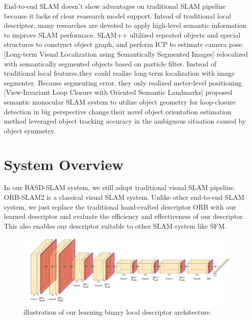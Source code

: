 \documentclass[conference]{IEEEtran}
\begin{document}
End-to-end SLAM doesn't show advantages on traditional SLAM pipeline because it lacks of clear reasearch model support. Intead of traditional local descriptor, many researches are devoted to apply high-level semantic information to improve SLAM performace. 
SLAM++ \cite{c22}ultilized repeated objects and special structures to construct object graph, and perform ICP to estimate camera pose.  
[Long-term Visual Localization using Semantically Segmented Images] \cite{c23}relocalized with semantically segmented objects based on particle filter. Instead of traditional local features,they could realize long-term localization with image segmenter. Because segmenting error, they only realized meter-level positioning.  
[View-Invariant Loop Closure with Oriented Semantic Landmarks] \cite{c24}proposed semantic monocular SLAM system  to utilize object geometry for loop-closure detection in big perspective change.their novel object orientation estimation method  leveraged object tracking accuracy in the ambiguous situation caused by object symmetry.



\section{System Overview}
In our BASD-SLAM system, we still adopt traditional visual SLAM pipeline. ORB-SLAM2 \cite{c25}is a classical visual SLAM system. Unlike other end-to-end SLAM system, we just replace the traditional hand-crafted descriptor ORB with our learned descriptor and evaluate the efficiency and effectiveness of our descriptor. This also enables our descriptor suitable to other SLAM system like SFM.


\begin{figure}[h]
\centering
\includegraphics[scale=0.26]{BASD_Net}
\caption{ illustration of our learning binary local descriptor architecture.} \scriptsize
\end{figure}
\end{document}
